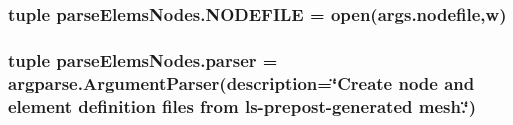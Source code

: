 \subsubsection[{N\+O\+D\+E\+F\+I\+L\+E}]{\setlength{\rightskip}{0pt plus 5cm}tuple parse\+Elems\+Nodes.\+N\+O\+D\+E\+F\+I\+L\+E = open(args.\+nodefile,\textquotesingle{}w\textquotesingle{})}\label{namespaceparseElemsNodes_a63635a902bbe24578f2c3769b65741b8}
\hypertarget{namespaceparseElemsNodes_a95f874234ce24397d1e88704544a3da0}{}
\subsubsection[{parser}]{\setlength{\rightskip}{0pt plus 5cm}tuple parse\+Elems\+Nodes.\+parser = argparse.\+Argument\+Parser(description=\char`\"{}Create node and element definition files {\bf from} ls-\/prepost-\/generated mesh.\char`\"{})}\label{namespaceparseElemsNodes_a95f874234ce24397d1e88704544a3da0}
